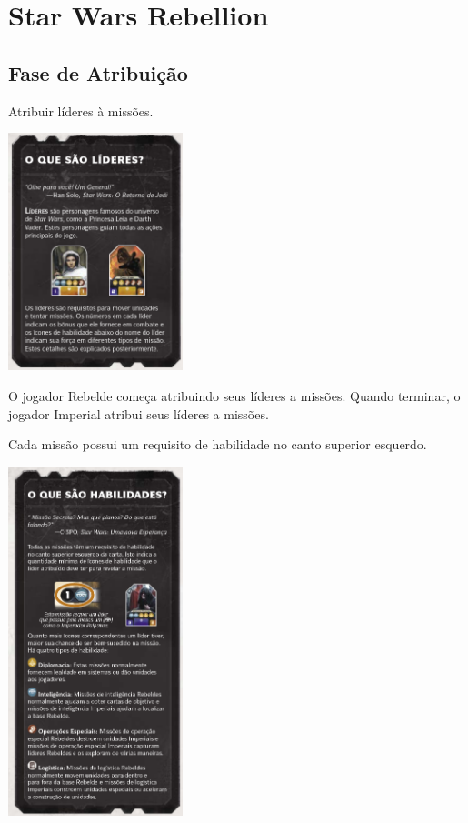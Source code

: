 \documentclass[11pt]{article}
\author{Fabio Favero Henkes}
\date{\today}
\title{}
\begin{document}
\tableofcontents


\section{Star Wars Rebellion}
\label{sec:orgd4c4269}

\subsection{Fase de Atribuição}
\label{sec:org3030b15}

Atribuir líderes à missões.

\begin{center}
\includegraphics[width=2.0in]{./lider.png}
\end{center}

O jogador Rebelde começa atribuindo seus líderes a missões. Quando terminar, o jogador Imperial atribui seus líderes a missões.

Cada missão possui um requisito de habilidade no canto superior esquerdo.

\begin{center}
\includegraphics[width=2.0in]{./skills.png}
\end{center}
\end{document}
